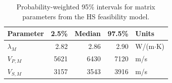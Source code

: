\begin{table}[ht!]
\centering
\caption{Probability-weighted 95\% intervals for matrix parameters from the HS feasibility model.}
\label{tab:hs_prob_weighted_95ci}
\begin{tabular}{lrrrl}
\toprule
\textbf{Parameter} & \textbf{2.5\%} & \textbf{Median} & \textbf{97.5\%} & \textbf{Units} \\
\midrule
$\lambda_M$ & 2.82 & 2.86 & 2.90 & W/(m$\cdot$K) \\
$V_{P,M}$ & 5621 & 6430 & 7120 & m/s \\
$V_{S,M}$ & 3157 & 3543 & 3916 & m/s \\
\bottomrule
\end{tabular}
\end{table}

